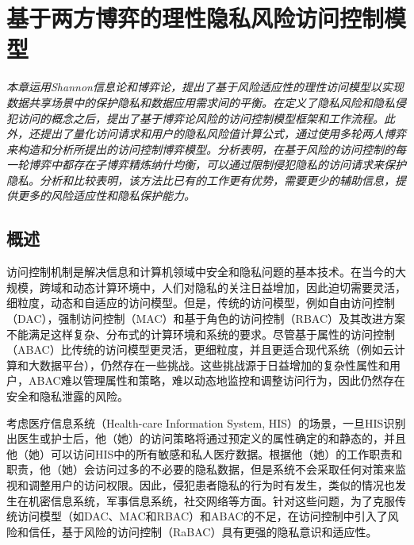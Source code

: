 \chapter{基于两方博弈的理性隐私风险访问控制模型}
\label{chap:game-theoretical-RaBAC-for-privacy}

\textit{}

\textit{本章运用Shannon信息论和博弈论，提出了基于风险适应性的理性访问模型以实现数据共享场景中的保护隐私和数据应用需求间的平衡。在定义了隐私风险和隐私侵犯访问的概念之后，提出了基于博弈论风险的访问控制模型框架和工作流程。此外，还提出了量化访问请求和用户的隐私风险值计算公式，通过使用多轮两人博弈来构造和分析所提出的访问控制博弈模型。分析表明，在基于风险的访问控制的每一轮博弈中都存在子博弈精炼纳什均衡，可以通过限制侵犯隐私的访问请求来保护隐私。分析和比较表明，该方法比已有的工作更有优势，需要更少的辅助信息，提供更多的风险适应性和隐私保护能力。}

\section{概述}

访问控制机制是解决信息和计算机领域中安全和隐私问题的基本技术。在当今的大规模，跨域和动态计算环境中，人们对隐私的关注日益增加，因此迫切需要灵活，细粒度，动态和自适应的访问模型。但是，传统的访问模型，例如自由访问控制（DAC）\cite{lampson1974protection}，强制访问控制（MAC）\cite{bell1973secure}和基于角色的访问控制（RBAC）\cite{sandhu1996role}及其改进方案不能满足这样复杂、分布式的计算环境和系统的要求。尽管基于属性的访问控制（ABAC）\cite{kuhn2010adding}比传统的访问模型更灵活，更细粒度，并且更适合现代系统（例如云计算和大数据平台），仍然存在一些挑战\cite{servos2017current,paci2018survey}。这些挑战源于日益增加的复杂性属性和用户，ABAC难以管理属性和策略，难以动态地监控和调整访问行为，因此仍然存在安全和隐私泄露的风险。

考虑医疗信息系统（Health-care Information System, HIS）的场景，一旦HIS识别出医生或护士后，他（她）的访问策略将通过预定义的属性确定的和静态的，并且他（她）可以访问HIS中的所有敏感和私人医疗数据。根据他（她）的工作职责和职责，他（她）会访问过多的不必要的隐私数据，但是系统不会采取任何对策来监视和调整用户的访问权限。因此，侵犯患者隐私的行为时有发生，类似的情况也发生在机密信息系统，军事信息系统，社交网络等方面。针对这些问题，为了克服传统访问模型（如DAC、MAC和RBAC）和ABAC的不足，在访问控制中引入了风险\cite{cheng2007fuzzy, zhang2018privacy}和信任\cite{dimmock2004using, pustchi2015mt}，基于风险的访问控制（RaBAC）\cite{cheng2007fuzzy}具有更强的隐私意识和适应性\cite{ni2010risk, wang2011quantified, zhang2018privacy}。


